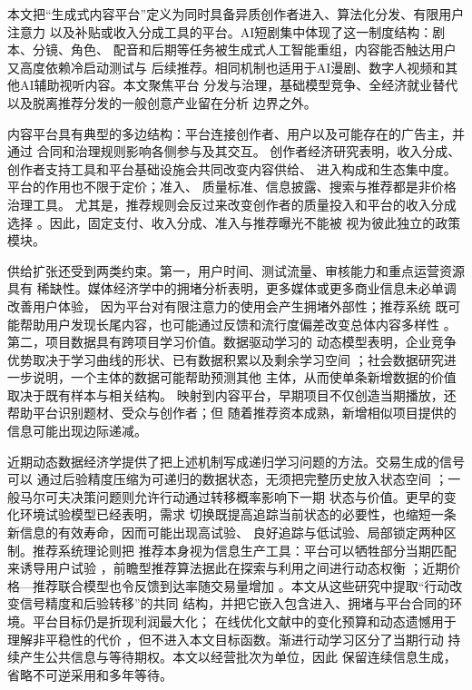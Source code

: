 \documentclass[UTF8, a4paper, 12pt, fontset=fandol]{ctexart}
\theoremstyle{definition}
\theoremstyle{remark}
\begin{document}
本文把“生成式内容平台”定义为同时具备异质创作者进入、算法化分发、有限用户注意力
以及补贴或收入分成工具的平台。AI短剧集中体现了这一制度结构：剧本、分镜、角色、
配音和后期等任务被生成式人工智能重组，内容能否触达用户又高度依赖冷启动测试与
后续推荐。相同机制也适用于AI漫剧、数字人视频和其他AI辅助视听内容。本文聚焦平台
分发与治理，基础模型竞争、全经济就业替代以及脱离推荐分发的一般创意产业留在分析
边界之外。

内容平台具有典型的多边结构：平台连接创作者、用户以及可能存在的广告主，并通过
合同和治理规则影响各侧参与及其交互\citep{rochet2003platform,hagiu2015multisided}。
创作者经济研究表明，收入分成、创作者支持工具和平台基础设施会共同改变内容供给、
进入构成和生态集中度\citep{bhargava2022creator}。平台的作用也不限于定价；准入、
质量标准、信息披露、搜索与推荐都是非价格治理工具\citep{teh2022governance}。
尤其是，推荐规则会反过来改变创作者的质量投入和平台的收入分成选择
\citep{qian2024digitalcontent}。因此，固定支付、收入分成、准入与推荐曝光不能被
视为彼此独立的政策模块。

供给扩张还受到两类约束。第一，用户时间、测试流量、审核能力和重点运营资源具有
稀缺性。媒体经济学中的拥堵分析表明，更多媒体或更多商业信息未必单调改善用户体验，
因为平台对有限注意力的使用会产生拥堵外部性\citep{anderson2023adclutter}；推荐系统
既可能帮助用户发现长尾内容，也可能通过反馈和流行度偏差改变总体内容多样性
\citep{fleder2009blockbuster}。第二，项目数据具有跨项目学习价值。数据驱动学习的
动态模型表明，企业竞争优势取决于学习曲线的形状、已有数据积累以及剩余学习空间
\citep{hagiu2023data}；社会数据研究进一步说明，一个主体的数据可能帮助预测其他
主体，从而使单条新增数据的价值取决于既有样本与相关结构\citep{bergemann2022socialdata}。
映射到内容平台，早期项目不仅创造当期播放，还帮助平台识别题材、受众与创作者；但
随着推荐资本成熟，新增相似项目提供的信息可能出现边际递减。

近期动态数据经济学提供了把上述机制写成递归学习问题的方法。交易生成的信号可以
通过后验精度压缩为可递归的数据状态，无须把完整历史放入状态空间
\citep{farboodi2022data}；一般马尔可夫决策问题则允许行动通过转移概率影响下一期
状态与价值\citep{esponda2021misspecified}。更早的变化环境试验模型已经表明，需求
切换既提高追踪当前状态的必要性，也缩短一条新信息的有效寿命，因而可能出现高试验、
良好追踪与低试验、局部锁定两种区制\citep{keller1999changing}。推荐系统理论则把
推荐本身视为信息生产工具：平台可以牺牲部分当期匹配来诱导用户试验
\citep{che2018recommender}，前瞻型推荐算法据此在探索与利用之间进行动态权衡
\citep{cao2024exploration}；近期价格---推荐联合模型也令反馈到达率随交易量增加
\citep{xu2026feedback}。本文从这些研究中提取“行动改变信号精度和后验转移”的共同
结构，并把它嵌入包含进入、拥堵与平台合同的环境。平台目标仍是折现利润最大化；
在线优化文献中的变化预算和动态遗憾用于理解非平稳性的代价
\citep{besbes2015nonstationary}，但不进入本文目标函数。渐进行动学习区分了当期行动
持续产生公共信息与等待期权\citep{laiho2025gradual}。本文以经营批次为单位，因此
保留连续信息生成，省略不可逆采用和多年等待。
\end{document}
